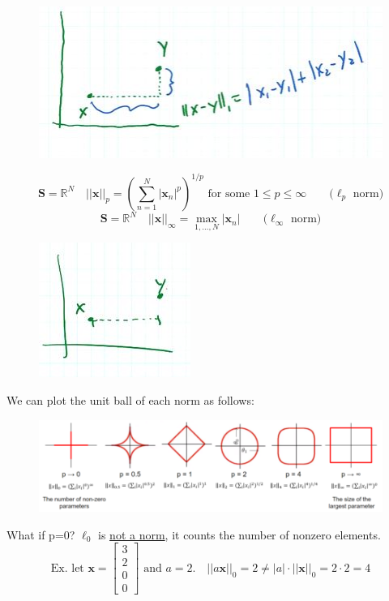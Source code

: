 \documentclass[12pt]{article}
\begin{document}
\begin{figure}[H]
    \centering
    \includegraphics[width=0.5\linewidth]{6250-L08-IMG2.JPG}
\end{figure}
\begin{equation*}
    \mathbf{S} = \mathbb{R}^N \quad ||\mathbf{x}||_p = (\sum_{n=1}^N |\mathbf{x}_n|^p)^{1/p} \text{ for some } 1\leq p \leq \infty \qquad (\ell_p \text{ norm)}
\end{equation*}
\begin{equation*}
    \mathbf{S} = \mathbb{R}^N \quad ||\mathbf{x}||_{\infty} = \max\limits_{1,\dots,N} |\mathbf{x}_n| \qquad (\ell_{\infty} \text{ norm)}
\end{equation*}
\begin{figure}[H]
    \centering
    \includegraphics[width=0.5\linewidth]{6250-L08-IMG3.JPG}
\end{figure}
We can plot the unit ball of each norm as follows:
\begin{figure}[H]
    \centering
    \includegraphics[width=1\linewidth]{6250-L08-IMG4.png}
\end{figure}
What if p=0? $\ell_0$ is \underline{not a norm}, it counts the number of nonzero elements. \\
\begin{equation*}
    \text{Ex. let }  
    \mathbf{x} = 
    \begin{bmatrix}
            3 \\
            2 \\
            0 \\
            0
    \end{bmatrix} 
    \text{ and } a=2. \quad ||a\mathbf{x}||_0 = 2 \neq |a|\cdot||\mathbf{x}||_0 = 2\cdot 2 = 4
\end{equation*}
\end{document}
